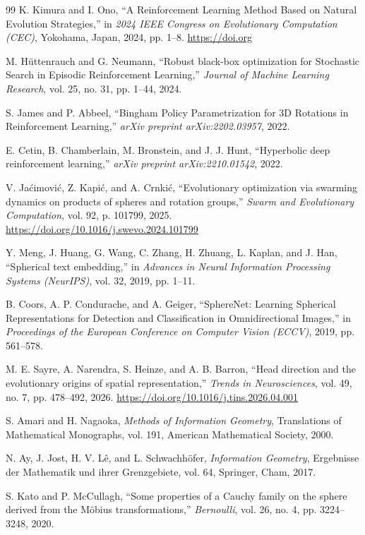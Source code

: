 \documentclass{article}
\theoremstyle{plain}%
\theoremstyle{definition}
\theoremstyle{remark}
\theoremstyle{prop}
\begin{document}
\begin{thebibliography}{99}
K. Kimura and I. Ono, ``A Reinforcement Learning Method Based on Natural Evolution Strategies,'' in \emph{2024 IEEE Congress on Evolutionary Computation (CEC)}, Yokohama, Japan, 2024, pp. 1--8. \url{https://doi.org}

M. Hüttenrauch and G. Neumann, ``Robust black-box optimization for Stochastic Search in Episodic Reinforcement Learning,'' \emph{Journal of Machine Learning Research}, vol. 25, no. 31, pp. 1--44, 2024.

S. James and P. Abbeel, ``Bingham Policy Parametrization for 3D Rotations in Reinforcement Learning,'' \emph{arXiv preprint arXiv:2202.03957}, 2022.

E. Cetin, B. Chamberlain, M. Bronstein, and J. J. Hunt, ``Hyperbolic deep reinforcement learning,'' \emph{arXiv preprint arXiv:2210.01542}, 2022.

V. Jaćimović, Z. Kapić, and A. Crnkić, ``Evolutionary optimization via swarming dynamics on products of spheres and rotation groups,'' \emph{Swarm and Evolutionary Computation}, vol. 92, p. 101799, 2025. \url{https://doi.org/10.1016/j.swevo.2024.101799}

Y. Meng, J. Huang, G. Wang, C. Zhang, H. Zhuang, L. Kaplan, and J. Han, ``Spherical text embedding,'' in \emph{Advances in Neural Information Processing Systems (NeurIPS)}, vol. 32, 2019, pp. 1--11.

B. Coors, A. P. Condurache, and A. Geiger, ``SphereNet: Learning Spherical Representations for Detection and Classification in Omnidirectional Images,'' in \emph{Proceedings of the European Conference on Computer Vision (ECCV)}, 2019, pp. 561--578.

M. E. Sayre, A. Narendra, S. Heinze, and A. B. Barron, ``Head direction and the evolutionary origins of spatial representation,'' \emph{Trends in Neurosciences}, vol. 49, no. 7, pp. 478--492, 2026. \url{https://doi.org/10.1016/j.tins.2026.04.001}

S. Amari and H. Nagaoka, \emph{Methods of Information Geometry}, Translations of Mathematical Monographs, vol. 191, American Mathematical Society, 2000.

N. Ay, J. Jost, H. V. Lê, and L. Schwachhöfer, \emph{Information Geometry}, Ergebnisse der Mathematik und ihrer Grenzgebiete, vol. 64, Springer, Cham, 2017.

S. Kato and P. McCullagh, ``Some properties of a Cauchy family on the sphere derived from the Möbius transformations,'' \emph{Bernoulli}, vol. 26, no. 4, pp. 3224--3248, 2020.


\end{thebibliography}
\end{document}
